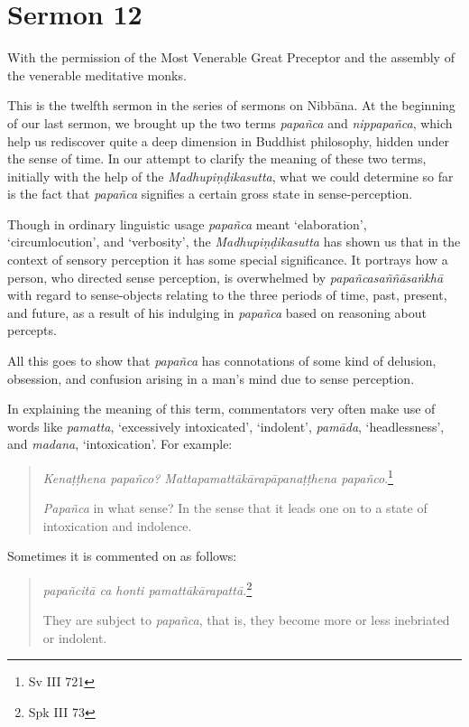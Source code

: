 \chapter{Sermon 12}

\NibbanaOpeningQuote

With the permission of the Most Venerable Great Preceptor and the assembly of the venerable meditative monks.

This is the twelfth sermon in the series of sermons on Nibbāna. At the beginning of our last sermon, we brought up the two terms \emph{papañca} and \emph{nippapañca}, which help us rediscover quite a deep dimension in Buddhist philosophy, hidden under the sense of time. In our attempt to clarify the meaning of these two terms, initially with the help of the \emph{Madhupiṇḍikasutta}, what we could determine so far is the fact that \emph{papañca} signifies a certain gross state in sense-perception.

Though in ordinary linguistic usage \emph{papañca} meant `elaboration', `circumlocution', and `verbosity', the \emph{Madhupiṇḍikasutta} has shown us that in the context of sensory perception it has some special significance. It portrays how a person, who directed sense perception, is overwhelmed by \emph{papañcasaññāsaṅkhā} with regard to sense-objects relating to the three periods of time, past, present, and future, as a result of his indulging in \emph{papañca} based on reasoning about percepts.

All this goes to show that \emph{papañca} has connotations of some kind of delusion, obsession, and confusion arising in a man's mind due to sense perception.

In explaining the meaning of this term, commentators very often make use of words like \emph{pamatta}, `excessively intoxicated', `indolent', \emph{pamāda}, `headlessness', and \emph{madana}, `intoxication'. For example:

\begin{quote}
\emph{Kenaṭṭhena papañco? Mattapamattākārapāpanaṭṭhena papañco}.\footnote{Sv III 721}

\emph{Papañca} in what sense? In the sense that it leads one on to a state of intoxication and indolence.
\end{quote}

Sometimes it is commented on as follows:

\begin{quote}
\emph{papañcitā ca honti pamattākārapattā.}\footnote{Spk III 73}

They are subject to \emph{papañca}, that is, they become more or less inebriated or indolent.
\end{quote}

